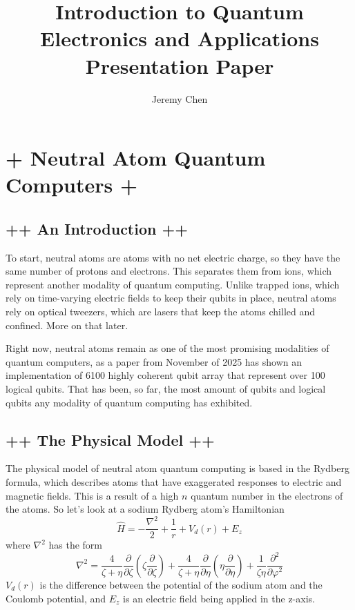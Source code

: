 \documentclass[10pt,letterpaper]{article}
\title{Introduction to Quantum Electronics and Applications Presentation Paper}
\author{Jeremy Chen}
\begin{document}
	\maketitle
	
\section*{+ Neutral Atom Quantum Computers +}

\subsection*{++ An Introduction ++}

To start, neutral atoms are atoms with no net electric charge, so they have the same number of protons and electrons. This separates them from ions, which represent another modality of quantum computing. Unlike trapped ions, which rely on time-varying electric fields to keep their qubits in place, neutral atoms rely on optical tweezers, which are lasers that keep the atoms chilled and confined. More on that later.

Right now, neutral atoms remain as one of the most promising modalities of quantum computers, as a paper from November of 2025 has shown an implementation of 6100 highly coherent qubit array that represent over 100 logical qubits. That has been, so far, the most amount of qubits and logical qubits any modality of quantum computing has exhibited. 

\subsection*{++ The Physical Model ++}

The physical model of neutral atom quantum computing is based in the Rydberg formula, which describes atoms that have exaggerated responses to electric and magnetic fields. This is a result of a high $n$ quantum number in the electrons of the atoms. So let's look at a sodium Rydberg atom's Hamiltonian
$$\hat{H} = -\frac{\nabla^{2}}{2} + \frac{1}{r} + V_{d}(r) + E_{z}$$
where $\nabla^{2}$ has the form
$$\nabla^{2} = \frac{4}{\zeta + \eta}\frac{\partial}{\partial \zeta} \left( \zeta \frac{\partial}{\partial \zeta} \right) + \frac{4}{\zeta + \eta} \frac{\partial}{\partial \eta}\left( \eta \frac{\partial}{\partial \eta} \right) + \frac{1}{\zeta \eta}\frac{\partial^{2}}{\partial \varphi^{2}}$$
$V_{d}(r)$ is the difference between the potential of the sodium atom and the Coulomb potential, and $E_{z}$ is an electric field being applied in the z-axis. 
\end{document}
